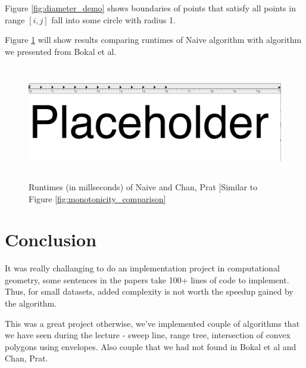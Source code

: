 \documentclass{article}
\begin{document}
Figure \ref{fig:diameter_demo} shows boundaries of points that satisfy all points in range $[i, j]$ fall into some circle with radius 1.

Figure \ref{fig:diameter_comparison} will show results comparing runtimes of Naive algorithm with algorithm we presented from Bokal et al.
\begin{figure}[!ht]
  \centering
  \includegraphics[height=5cm]{plots/diameter_comparison}
  \caption{Runtimes (in millseconds) of Naive and Chan, Prat [Similar to Figure \ref{fig:monotonicity_comparison}}
  \label{fig:diameter_comparison}
\end{figure}

\section{Conclusion}
It was really challanging to do an implementation project in computational geometry, some sentences in the papers take 100+ lines of code to implement. Thus, for small datasets, added complexity is not worth the speedup gained by the algorithm.

This was a great project otherwise, we've implemented couple of algorithms that we have seen during the lecture - sweep line, range tree, intersection of convex polygons using envelopes. Also couple that we had not found in Bokal et al and Chan, Prat.



\end{document}
